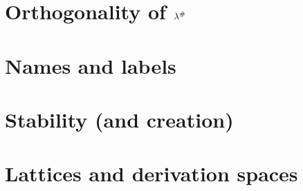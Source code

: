 \section{Orthogonality of $\lambda^{\mathtt{\#}}$}


\section{Names and labels}


\section{Stability (and creation)}


\section{Lattices and derivation spaces}





